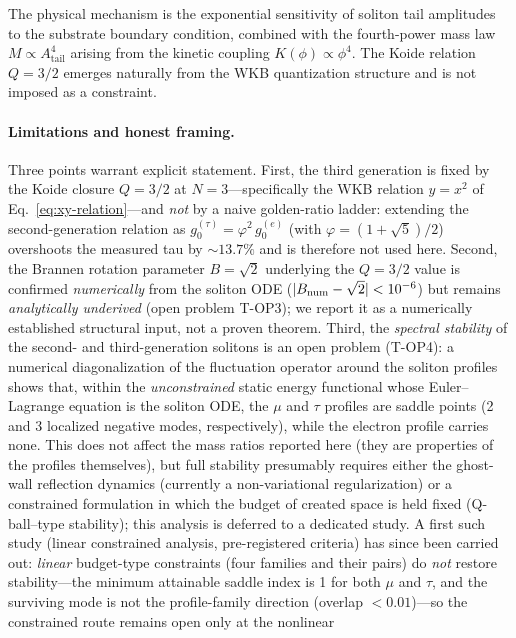 \documentclass[11pt,a4paper]{article}
\newcommand{\Atail}{A_{\mathrm{tail}}}
\begin{document}
The physical mechanism is the exponential sensitivity of soliton
tail amplitudes to the substrate boundary condition, combined with
the fourth-power mass law $M \propto \Atail^4$ arising from the
kinetic coupling $K(\phi) \propto \phi^4$.  The Koide relation
$Q = 3/2$ emerges naturally from the WKB quantization structure
and is not imposed as a constraint.

\paragraph{Limitations and honest framing.}
Three points warrant explicit statement.  First, the third generation
is fixed by the Koide closure $Q = 3/2$ at $N=3$---specifically the
WKB relation $y = x^2$ of Eq.~\eqref{eq:xy-relation}---and \emph{not}
by a naive golden-ratio ladder: extending the second-generation
relation as $g_0^{(\tau)} = \varphi^2\,g_0^{(e)}$ (with
$\varphi=(1+\sqrt{5})/2$) overshoots the measured tau by
$\sim 13.7\%$ and is therefore not used here.  Second, the Brannen
rotation parameter $B = \sqrt{2}$ underlying the $Q=3/2$ value is
confirmed \emph{numerically} from the soliton ODE
($|B_{\rm num}-\sqrt{2}| < 10^{-6}$) but remains \emph{analytically
underived} (open problem T-OP3); we report it as a numerically
established structural input, not a proven theorem.  Third, the
\emph{spectral stability} of the second- and third-generation
solitons is an open problem (T-OP4): a numerical diagonalization
of the fluctuation operator around the soliton profiles shows that,
within the \emph{unconstrained} static energy functional whose
Euler--Lagrange equation is the soliton ODE, the $\mu$ and $\tau$
profiles are saddle points (2 and 3 localized negative modes,
respectively), while the electron profile carries none.  This does
not affect the mass ratios reported here (they are properties of
the profiles themselves), but full stability presumably requires
either the ghost-wall reflection dynamics (currently a
non-variational regularization) or a constrained formulation in
which the budget of created space is held fixed
(Q-ball--type stability); this analysis is deferred to a
dedicated study.  A first such study (linear constrained
analysis, pre-registered criteria) has since been carried out:
\emph{linear} budget-type constraints (four families and their
pairs) do \emph{not} restore stability---the minimum attainable
saddle index is 1 for both $\mu$ and $\tau$, and the surviving
mode is not the profile-family direction (overlap $<0.01$)---so
the constrained route remains open only at the nonlinear
\end{document}
